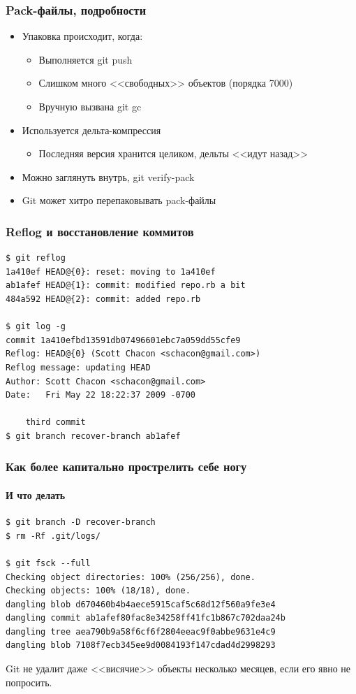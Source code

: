 \documentclass[xetex,mathserif,serif]{beamer}
\begin{document}
	\begin{frame}
		\frametitle{Pack-файлы, подробности}
		\begin{itemize}
			\item Упаковка происходит, когда:
			\begin{itemize}
				\item Выполняется git push
				\item Слишком много <<свободных>> объектов (порядка 7000)
				\item Вручную вызвана git gc
			\end{itemize}
			\item Используется дельта-компрессия
			\begin{itemize}
				\item Последняя версия хранится целиком, дельты <<идут назад>>
			\end{itemize}
			\item Можно заглянуть внутрь, git verify-pack
			\item Git может хитро перепаковывать pack-файлы
		\end{itemize}
	\end{frame}

	\begin{frame}[fragile]
		\frametitle{Reflog и восстановление коммитов}
			\begin{verbatim}
$ git reflog
1a410ef HEAD@{0}: reset: moving to 1a410ef
ab1afef HEAD@{1}: commit: modified repo.rb a bit
484a592 HEAD@{2}: commit: added repo.rb

$ git log -g
commit 1a410efbd13591db07496601ebc7a059dd55cfe9
Reflog: HEAD@{0} (Scott Chacon <schacon@gmail.com>)
Reflog message: updating HEAD
Author: Scott Chacon <schacon@gmail.com>
Date:   Fri May 22 18:22:37 2009 -0700

    third commit
$ git branch recover-branch ab1afef
			\end{verbatim}
	\end{frame}

	\begin{frame}[fragile]
		\frametitle{Как более капитально прострелить себе ногу}
		\framesubtitle{И что делать}
		\begin{verbatim}
$ git branch -D recover-branch
$ rm -Rf .git/logs/

$ git fsck --full
Checking object directories: 100% (256/256), done.
Checking objects: 100% (18/18), done.
dangling blob d670460b4b4aece5915caf5c68d12f560a9fe3e4
dangling commit ab1afef80fac8e34258ff41fc1b867c702daa24b
dangling tree aea790b9a58f6cf6f2804eeac9f0abbe9631e4c9
dangling blob 7108f7ecb345ee9d0084193f147cdad4d2998293
		\end{verbatim}
		Git не удалит даже <<висячие>> объекты несколько месяцев, если его явно не попросить.
	\end{frame}
\end{document}
